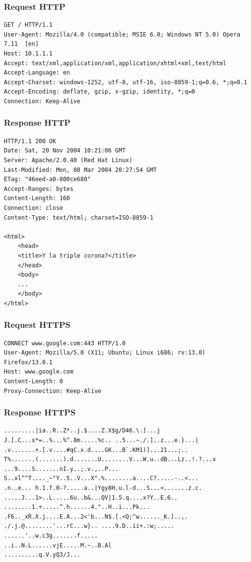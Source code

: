 \documentclass[10pt,a4paper]{beamer}
\begin{document}
\begin{frame}[fragile]
	\frametitle{Request HTTP}
	{\small
	\begin{verbatim}
GET / HTTP/1.1
User-Agent: Mozilla/4.0 (compatible; MSIE 6.0; Windows NT 5.0) Opera 7.11  [en]
Host: 10.1.1.1
Accept: text/xml,application/xml,application/xhtml+xml,text/html
Accept-Language: en
Accept-Charset: windows-1252, utf-8, utf-16, iso-8859-1;q=0.6, *;q=0.1
Accept-Encoding: deflate, gzip, x-gzip, identity, *;q=0
Connection: Keep-Alive
	\end{verbatim}
	}
\end{frame}

\begin{frame}[fragile]
	\frametitle{Response HTTP}
	{\small
	\begin{verbatim}
HTTP/1.1 200 OK
Date: Sat, 20 Nov 2004 10:21:06 GMT
Server: Apache/2.0.40 (Red Hat Linux)
Last-Modified: Mon, 08 Mar 2004 20:27:54 GMT
ETag: "46eed-a0-800ce680"
Accept-Ranges: bytes
Content-Length: 160
Connection: close
Content-Type: text/html; charset=ISO-8859-1

<html>
	<head>
	<title>Y la triple corona?</title>
	</head>
	<body>
	...
	</body>
</html>
	\end{verbatim}
	}
\end{frame}

\begin{frame}[fragile]
	\frametitle{Request HTTPS}
	{\small
	\begin{verbatim}
CONNECT www.google.com:443 HTTP/1.0
User-Agent: Mozilla/5.0 (X11; Ubuntu; Linux i686; rv:13.0) Firefox/13.0.1
Host: www.google.com
Content-Length: 0
Proxy-Connection: Keep-Alive
	\end{verbatim}
	}
\end{frame}

\begin{frame}[fragile]
	\frametitle{Response HTTPS}
	{\small
	\begin{verbatim}
.........|ia..R..Z*..j.$....Z.X$g/D46.\.]...j
J.[.C...x*=..%...%^.8m.....%c.. ..5...~./.]..z...e.}...|
.v.......+.[.v....#qC.x.d....GK...B`.KM1)]...21...;..
T%.......(.......).d.......U........V...W.u..dB...Lz..!.?...x
...9....S.......nI.y..;.v.,..P...
S..xl^^T...._~"Y..5..V...X".%........a....C?.....-..<...
.n..e... h.1.f.0-?.....a..|Ygy8H.u.l-d...S...<.......z.c.
.....J...1>..L.....6u..b&...QV|1.5.q....x?Y..E.6..
........1.+.....^.h......4."..H..i...Pk...
.F6.._xR.X.j....E.A...2<'b...N$.[.<Q;^w......_K.]..,.
./.j.@........'...rC...w}.. ....9.D..ii+.:w;.....
......'..w.c3g.......f.....
..i..N.L......vjE.....M.~..B.Al
..........q.V.yQ3/J...
	\end{verbatim}
	}
\end{frame}
\end{document}
